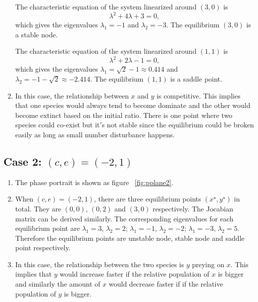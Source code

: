 \begin{enumerate}
The characteristic equation of the system linearized around $(3,0)$ is
$$\lambda^2 +4 \lambda + 3 = 0,$$ which gives the eigenvalues $\lambda_1 = -1$ and $\lambda_2 = -3$. The equilibrium $(3,0)$ is a stable node.

The characteristic equation of the system linearized around $(1,1)$ is $$\lambda^2 +2 \lambda - 1 = 0,$$ which gives the eigenvalues $\lambda_1 = \sqrt{2} -1 \approx 0.414$ and $\lambda_2 = -1 -\sqrt{2} \approx -2.414$. The equilibrium $(1,1)$ is a saddle point.

\item In this case, the relationship between $x$ and $y$ is competitive. This implies that one species would always tend to become dominate and the other would become extinct based on the initial ratio. There is one point where two species could co-exist but it$'$s not stable since the equilibrium could be broken easily as long as small number disturbance happens.  
\end{enumerate}

\subsection*{Case 2: $(c,e)=(-2,1)$}
\begin{enumerate}
\item The phase portrait is shown as figure ~\ref{fig:pplane2}.
\item When $(c,e)=(-2,1)$, there are three equilibrium points $(x^\star,y^\star)$ in total. They are $(0,0)$, $(0,2)$ and $(3,0)$ respectively. The Jocabian matrix can be derived similarly. The corresponding eigenvalues for each equilibrium point are $\lambda_{1} = 3$, $\lambda_{2} = 2$; $\lambda_1 = -1$, $\lambda_2 = -2$; $\lambda_1 = -3$, $\lambda_2 = 5$. Therefore the equilibrium points are unstable node, stable node and saddle point respectively.
\item In this case, the relationship between the two species is $y$ preying on $x$. This implies that $y$ would increase faster if the relative population of $x$ is bigger and similarly the amount of $x$ would decrease faster if if the relative population of $y$ is bigger.
\end{enumerate}

